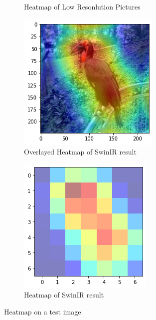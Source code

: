 \documentclass[10pt,twocolumn,letterpaper]{article}
\begin{document}
\begin{figure}[h]
\begin{subfigure}{0.18\textwidth}
        \caption{Heatmap of Low Resonlution Pictures}
        \label{fig:h2}
    \end{subfigure}
    \begin{subfigure}{0.18\textwidth}
        \includegraphics[width=1\linewidth]{heatmap_sw.png}
        \caption{Overlayed Heatmap of SwinIR result}
        \label{fig:h3}
    \end{subfigure}
    \begin{subfigure}{0.18\textwidth}
        \includegraphics[width=1\linewidth]{heat_sw.png}
        \caption{Heatmap of SwinIR result}
        \label{fig:h4}
    \end{subfigure}
\caption{Heatmap on a test image}
\label{fig:heatmap}
\end{figure}
\end{document}
